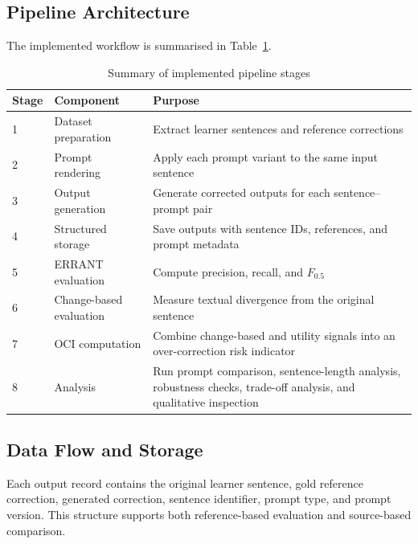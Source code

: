 \subsection{Pipeline Architecture}

The implemented workflow is summarised in Table~\ref{tab:chapter4_pipeline_stages}.

\begin{table}[htbp]
    \centering
    \caption{Summary of implemented pipeline stages}
    \label{tab:chapter4_pipeline_stages}
    \begin{tabular}{|p{2cm}|p{4cm}|p{7cm}|}
        \hline
        \textbf{Stage} & \textbf{Component} & \textbf{Purpose} \\
        \hline
        1 & Dataset preparation & Extract learner sentences and reference corrections \\
        \hline
        2 & Prompt rendering & Apply each prompt variant to the same input sentence \\
        \hline
        3 & Output generation & Generate corrected outputs for each sentence--prompt pair \\
        \hline
        4 & Structured storage & Save outputs with sentence IDs, references, and prompt metadata \\
        \hline
        5 & ERRANT evaluation & Compute precision, recall, and $F_{0.5}$ \\
        \hline
        6 & Change-based evaluation & Measure textual divergence from the original sentence \\
        \hline
        7 & OCI computation & Combine change-based and utility signals into an over-correction risk indicator \\
        \hline
        8 & Analysis & Run prompt comparison, sentence-length analysis, robustness checks, trade-off analysis, and qualitative inspection \\
        \hline
    \end{tabular}
\end{table}

\subsection{Data Flow and Storage}

Each output record contains the original learner sentence, gold reference correction, generated correction, sentence identifier, prompt type, and prompt version. This structure supports both reference-based evaluation and source-based comparison.

